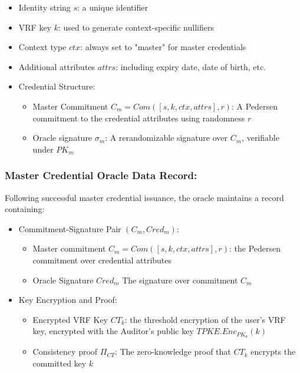 \begin{itemize}
    \item Identity string $s$: a unique identifier
    \item VRF key $k$: used to generate context-specific nullifiers
    \item Context type $ctx$: always set to "master" for master credentials
    \item Additional attributes $attrs$: including expiry date, date of birth, etc.
    \item Credential Structure:
    \begin{itemize}
        \item Master Commitment $C_m = Com([s, k, ctx, attrs],r)$: A Pedersen commitment to the credential attributes using randomness $r$
        \item Oracle signature $\sigma_m$: A rerandomizable signature over $C_m$, verifiable under $PK_m$
    \end{itemize}
\end{itemize}

\subsubsection{Master Credential Oracle Data Record:} Following successful master credential issuance, the oracle maintains a record containing:
\begin{itemize}
    \item Commitment-Signature Pair $(C_m, Cred_m)$:
    \begin{itemize}
        \item Master commitment $C_m = Com([s,k,ctx,attrs],r)$: the Pedersen commitment over credential attributes
        \item Oracle Signature $Cred_m$ The signature over commitment $C_m$
    \end{itemize}
    \item Key Encryption and Proof:
    \begin{itemize}
        \item Encrypted VRF Key $CT_k$: the threshold encryption of the user's VRF key, encrypted with the Auditor's public key $TPKE.Enc_{PK_a}(k)$
        \item Consistency proof $\Pi_{CT}$: The zero-knowledge proof that $CT_k$ encrypts the committed key $k$
    \end{itemize}
\end{itemize}


